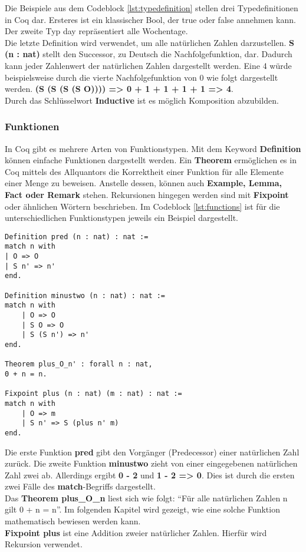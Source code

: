 Die Beispiele aus dem Codeblock \ref{lst:typedefinition} stellen drei Typedefinitionen in Coq dar. Ersteres ist ein klassischer Bool, der true oder false annehmen kann. Der zweite Typ day repräsentiert alle Wochentage. \\
Die letzte Definition wird verwendet, um alle natürlichen Zahlen darzustellen. \textbf{S (n : nat)} stellt den Successor, zu Deutsch die Nachfolgefunktion, dar. Dadurch kann jeder Zahlenwert der natürlichen Zahlen dargestellt werden. Eine 4 würde beispielsweise durch die vierte Nachfolgefunktion von 0 wie folgt dargestellt werden. \textbf{(S (S (S (S O)))) => 0 + 1 + 1 + 1 + 1 => 4}.\\
Durch das Schlüsselwort \textbf{Inductive} ist es möglich Komposition abzubilden.

\subsubsection{Funktionen}
In Coq gibt es mehrere Arten von Funktionstypen. Mit dem Keyword \textbf{Definition} können einfache Funktionen dargestellt werden.
Ein \textbf{Theorem} ermöglichen es in Coq mittels des Allquantors die Korrektheit einer Funktion für alle Elemente einer Menge zu beweisen. 
Anstelle dessen, können auch \textbf{Example, Lemma, Fact oder Remark} stehen.
Rekursionen hingegen werden sind mit \textbf{Fixpoint} oder ähnlichen Wörtern beschrieben.
Im Codeblock \ref{lst:functions} ist für die unterschiedlichen Funktionstypen jeweils ein Beispiel dargestellt.
\begin{lstlisting}[language=coq,firstnumber=1,caption=Coq Funktionen,label=lst:functions]
Definition pred (n : nat) : nat :=
match n with
| O => O
| S n' => n'
end.

Definition minustwo (n : nat) : nat :=
match n with
	| O => O
	| S O => O
	| S (S n') => n'
end.

Theorem plus_O_n' : forall n : nat,
0 + n = n.

Fixpoint plus (n : nat) (m : nat) : nat :=
match n with
	| O => m
	| S n' => S (plus n' m)
end.
\end{lstlisting}
Die erste Funktion \textbf{pred} gibt den Vorgänger (Predecessor) einer natürlichen Zahl zurück.
Die zweite Funktion \textbf{minustwo} zieht von einer eingegebenen natürlichen Zahl zwei ab. Allerdings ergibt \textbf{0 - 2} und \textbf{1 - 2 => 0}. Dies ist durch die ersten zwei Fälle des \textbf{match}-Begriffs dargestellt.\\
Das \textbf{Theorem plus\_O\_n} liest sich wie folgt: "`Für alle natürlichen Zahlen n gilt 0 + n = n"'. Im folgenden Kapitel wird gezeigt, wie eine solche Funktion mathematisch bewiesen werden kann.\\
\textbf{Fixpoint plus} ist eine Addition zweier natürlicher Zahlen. Hierfür wird Rekursion verwendet.

